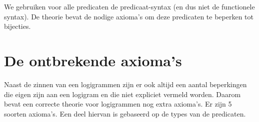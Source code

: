 We gebruiken voor alle predicaten de predicaat-syntax (en dus niet de functionele syntax). De theorie bevat de nodige axioma's om deze predicaten te beperken tot bijecties.



\section{De ontbrekende axioma's}
Naast de zinnen van een logigrammen zijn er ook altijd een aantal beperkingen die eigen zijn aan een logigram en die niet expliciet vermeld worden. Daarom bevat een correcte theorie voor logigrammen nog extra axioma's. Er zijn 5 soorten axioma's. Een deel hiervan is gebaseerd op de types van de predicaten.

